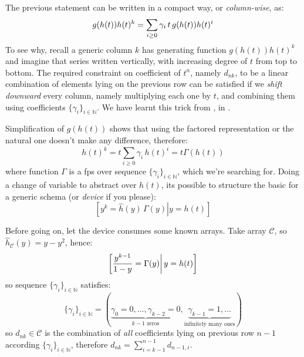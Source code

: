 The previous statement can be written in a compact way, or \emph{column-wise}, as:
\begin{displaymath}
    g(h(t))h(t)^k = \sum_{i\geq0}{\gamma_i\,t\,g(h(t)) h(t)^i}\\
\end{displaymath}
To see why, recall a generic column 
$k$ has generating function $g(h(t))h(t)^k$ and imagine that series written vertically, 
with increasing degree of $t$ from top to bottom.
The required constraint on coefficient of $t^n$, namely $d_{nk}$, 
to be a linear combination of elements lying on the previous row 
can be satisfied if we \emph{shift downward} every column,
namely multiplying each one by $t$, and combining them using coefficients
$\lbrace \gamma_{i} \rbrace_{i\in\mathbb{N}}$. 
We have learnt this trick from \citeauthor{shapiro:1991}, in \cite{shapiro:1991}.

Simplification of $g(h(t))$ shows that using the factored representation or
the natural one doesn't make any difference, therefore:
\begin{displaymath}
    h(t)^k = t \sum_{i\geq 0}{\gamma_i\,h(t)^i} = t \Gamma(h(t))
\end{displaymath}
where function $\Gamma$ is a \ac{fps} over sequence 
$\lbrace \gamma_{i} \rbrace_{i\in\mathbb{N}}$, which we're searching for.
Doing a change of variable to abstract over $h(t)$, its possible to
structure the basic for a generic schema (or \emph{device} if you please):
\begin{displaymath}
    \left.\left[y^{k} = \hat{h}(y)\,\Gamma(y) \right| y = h(t) \right]
\end{displaymath}

Before going on, let the device consumes some known arrays. Take 
array $\mathcal{C}$, so $\hat{h}_{\mathcal{C}}(y) = y-y^2$, hence:
\begin{displaymath}
    \left.\left[\frac{y^{k-1}}{1-y} =  \Gamma(y) \right| y = h(t) \right]\\
\end{displaymath}
so sequence $\lbrace \gamma_{i} \rbrace_{i\in\mathbb{N}}$ satisfies:
\begin{displaymath}
    \lbrace \gamma_{i} \rbrace_{i\in\mathbb{N}} = 
        \left(\underbrace{\gamma_{0}=0,\ldots,\gamma_{k-2}=0}_{k-1 \text{ zeros}},
            \underbrace{\gamma_{k-1}=1, \ldots}_{\text{infinitely many ones}} \right)
\end{displaymath}
so $d_{nk}\in\mathcal{C}$ is the combination of \emph{all} coefficients
lying on previous row $n-1$ according $\lbrace \gamma_{i} \rbrace_{i\in\mathbb{N}}$,
therefore $d_{nk}=\sum_{i=k-1}^{n-1}{d_{n-1,i}}$.

